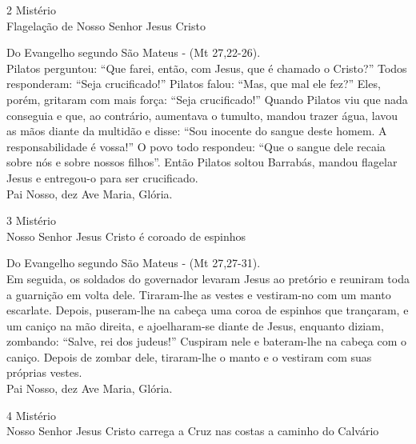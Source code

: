\documentclass{book}
\begin{document}
\begin{center}
    2\textordmasculine{} Mistério \\ Flagelação de Nosso Senhor Jesus Cristo
\end{center}
\begin{flushleft}
    Do Evangelho segundo São Mateus - (\textcolor{VioletRed2}{Mt 27,22-26}). \\
    \hfill{} \break{}
    Pilatos perguntou: ``Que farei, então, com Jesus, que é chamado o Cristo?'' Todos responderam: ``Seja crucificado!'' Pilatos falou: ``Mas, que mal ele fez?'' Eles, porém, gritaram com mais força: ``Seja crucificado!'' Quando Pilatos viu que nada conseguia e que, ao contrário, aumentava o tumulto, mandou trazer água, lavou as mãos diante da multidão e disse: ``Sou inocente do sangue deste homem. A responsabilidade é vossa!'' O povo todo respondeu: ``Que o sangue dele recaia sobre nós e sobre nossos filhos''. Então Pilatos soltou Barrabás, mandou flagelar Jesus e entregou-o para ser crucificado. \\
    \hfill{} \break{}
    Pai Nosso, dez Ave Maria, Glória.
\end{flushleft}
\newpage
\begin{center}
    3\textordmasculine{} Mistério \\ Nosso Senhor Jesus Cristo é coroado de espinhos
\end{center}
\begin{flushleft}
    Do Evangelho segundo São Mateus - (\textcolor{VioletRed2}{Mt 27,27-31}). \\
    \hfill{} \break{}
    Em seguida, os soldados do governador levaram Jesus ao pretório e reuniram toda a guarnição em volta dele. Tiraram-lhe as vestes e vestiram-no com um manto escarlate. Depois, puseram-lhe na cabeça uma coroa de espinhos que trançaram, e um caniço na mão direita, e ajoelharam-se diante de Jesus, enquanto diziam, zombando: ``Salve, rei dos judeus!'' Cuspiram nele e bateram-lhe na cabeça com o caniço. Depois de zombar dele, tiraram-lhe o manto e o vestiram com suas próprias vestes. \\
    \hfill{} \break{}
    Pai Nosso, dez Ave Maria, Glória.
\end{flushleft}
\begin{center}
    4\textordmasculine{} Mistério \\ Nosso Senhor Jesus Cristo carrega a Cruz nas costas a caminho do Calvário
\end{center}
\end{document}

